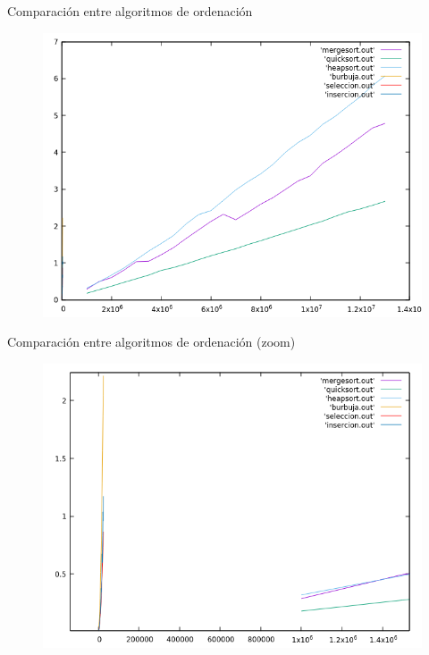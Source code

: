 \documentclass{beamer}
\begin{document}
\begin{frame}[fragile]{Comparación entre algoritmos de ordenación}
\begin{figure}[H]
\centering
\includegraphics[scale=0.5]{empirica_ordenacion_comparacion.png}
\end{figure}
\end{frame}

\begin{frame}[fragile]{Comparación entre algoritmos de ordenación (zoom)}
\begin{figure}[H]
\centering
\includegraphics[scale=0.5]{empirica_ordenacion_comparacion_zoom.png}
\end{figure}
\end{frame}
\end{document}
